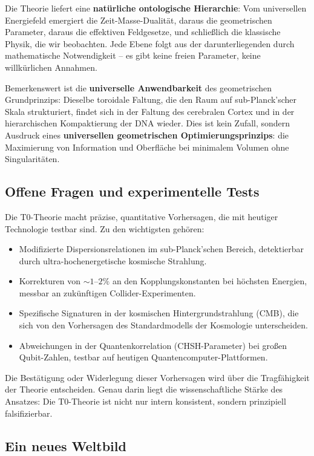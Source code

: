 \documentclass[11pt,oneside]{book}
\begin{document}
Die Theorie liefert eine \textbf{natürliche ontologische Hierarchie}: Vom universellen Energiefeld emergiert die Zeit-Masse-Dualität, daraus die geometrischen Parameter, daraus die effektiven Feldgesetze, und schließlich die klassische Physik, die wir beobachten. Jede Ebene folgt aus der darunterliegenden durch mathematische Notwendigkeit -- es gibt keine freien Parameter, keine willkürlichen Annahmen.

Bemerkenswert ist die \textbf{universelle Anwendbarkeit} des geometrischen Grundprinzips: Dieselbe toroidale Faltung, die den Raum auf sub-Planck'scher Skala strukturiert, findet sich in der Faltung des cerebralen Cortex und in der hierarchischen Kompaktierung der DNA wieder. Dies ist kein Zufall, sondern Ausdruck eines \textbf{universellen geometrischen Optimierungsprinzips}: die Maximierung von Information und Oberfläche bei minimalem Volumen ohne Singularitäten.

\subsection*{Offene Fragen und experimentelle Tests}

Die T0-Theorie macht präzise, quantitative Vorhersagen, die mit heutiger Technologie testbar sind. Zu den wichtigsten gehören:

\begin{itemize}[label=$\bullet$]
	\item Modifizierte Dispersionsrelationen im sub-Planck'schen Bereich, detektierbar durch ultra-hochenergetische kosmische Strahlung.
	\item Korrekturen von $\sim 1$--$2\%$ an den Kopplungskonstanten bei höchsten Energien, messbar an zukünftigen Collider-Experimenten.
	\item Spezifische Signaturen in der kosmischen Hintergrundstrahlung (CMB), die sich von den Vorhersagen des Standardmodells der Kosmologie unterscheiden.
	\item Abweichungen in der Quantenkorrelation (CHSH-Parameter) bei großen Qubit-Zahlen, testbar auf heutigen Quantencomputer-Plattformen.
\end{itemize}

Die Bestätigung oder Widerlegung dieser Vorhersagen wird über die Tragfähigkeit der Theorie entscheiden. Genau darin liegt die wissenschaftliche Stärke des Ansatzes: Die T0-Theorie ist nicht nur intern konsistent, sondern prinzipiell falsifizierbar.

\subsection*{Ein neues Weltbild}
\end{document}
